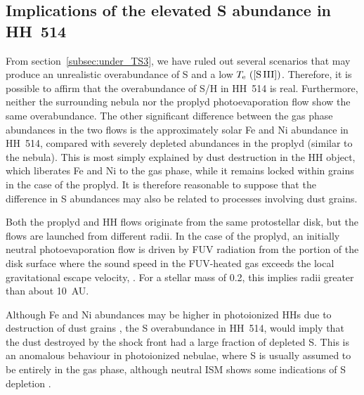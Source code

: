 \documentclass[fleqn,usenatbib]{mnras}
\begin{document}
\subsection{Implications of the elevated S abundance in HH~514}
\label{sec:why-do-two}
\label{subsec:real_overabundance}

From section~\ref{subsec:under_TS3}, we have ruled out several scenarios that may produce an unrealistic overabundance of S and a low $T_{\rm e} \text{ ([S\thinspace III])}$. Therefore, it is possible to affirm that the overabundance of S/H in HH~514 is real.
Furthermore, neither the surrounding nebula nor the proplyd photoevaporation flow
show the same overabundance.
The other significant difference between the gas phase abundances in the
two flows is the approximately solar Fe and Ni abundance in HH~514,
compared with severely depleted abundances in the proplyd (similar to the nebula).
This is most simply explained by dust destruction in the HH object,
which liberates Fe and Ni to the gas phase, while it remains locked within grains in the case of the proplyd.
It is therefore reasonable to suppose that the difference in S abundances
may also be related to processes involving dust grains.

Both the proplyd and HH flows originate from the same protostellar disk,
but the flows are launched from different radii.
In the case of the proplyd, an initially neutral photoevaporation flow
is driven by FUV radiation from the portion of the disk surface where
the sound speed in the FUV-heated gas exceeds the local gravitational escape velocity,
\citep{Johnstone:1998a}.
For a stellar mass of \SI{0.2}{\msun},
this implies radii greater than about \SI{10}{AU}.


Although Fe and Ni abundances may be higher in photoionized HHs  due to destruction of dust grains \citep[][]{Blagrave06, mesadelgado09, mendez2021, mendez2021-2}, the S overabundance in HH~514, would imply that the dust destroyed by the shock front had a large fraction of depleted S. This is an anomalous behaviour in photoionized nebulae, where S is usually assumed to be entirely in the gas phase, although neutral ISM shows some indications of S depletion \citep[][]{Jenkins09}.
\end{document}
